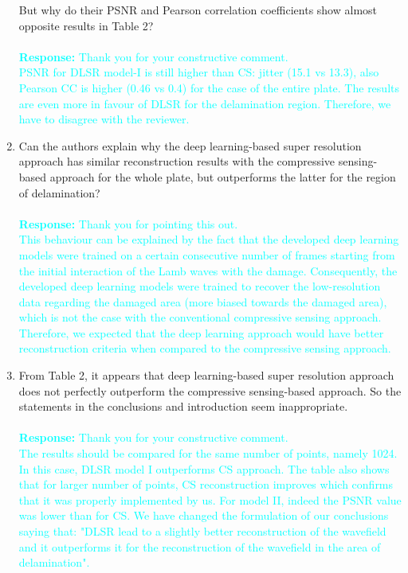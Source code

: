 \documentclass[11pt,a2paper]{report}
\begin{document}
\begin{enumerate}
		But why do their PSNR and Pearson correlation coefficients show almost opposite results in Table 2?
		\\ \\ 
		\textcolor{Cyan}
		{
			\textbf{Response:}
			Thank you for your constructive comment.\\
			PSNR for DLSR model-I is still higher than CS: jitter (15.1 vs 13.3), also Pearson CC is higher (0.46 vs 0.4) for the case of the entire plate. 
			The results are even more in favour of DLSR for the delamination region. 
			Therefore, we have to disagree with the reviewer.
		}
		\item  Can the authors explain why the deep learning-based super resolution approach has similar reconstruction results with the compressive sensing-based approach for the whole plate, but outperforms the latter for the region of delamination?
		\\ \\ 
		\textcolor{Cyan}
		{
			\textbf{Response:}
			Thank you for pointing this out. \\
			This behaviour can be explained by the fact that the developed deep learning models were trained on a certain consecutive number of frames starting from the initial interaction of the Lamb waves with the damage. 
			Consequently, the developed deep learning models were trained to recover the low-resolution data regarding the damaged area (more biased towards the damaged area), which is not the case with the conventional compressive sensing approach.
			Therefore, we expected that the deep learning approach would have better reconstruction criteria when compared to the compressive sensing approach.	
		}
		\item From Table 2, it appears that deep learning-based super resolution approach does not perfectly outperform the compressive sensing-based approach. 
		So the statements in the conclusions and introduction seem inappropriate.
		\\ \\ 
		\textcolor{Cyan}
		{
			\textbf{Response:}
			Thank you for your constructive comment. \\
			The results should be compared for the same number of points, namely 1024. 
			In this case, DLSR model I outperforms CS approach. 
			The table also shows that for larger number of points, CS reconstruction improves which confirms that it was properly implemented by us.
			For model II, indeed the PSNR value was lower than for CS. 
			We have changed the formulation of our conclusions saying that: "DLSR lead to a slightly better reconstruction of the wavefield and it outperforms it for the reconstruction of the wavefield in the area of delamination".
}
\end{enumerate}
\end{document}
